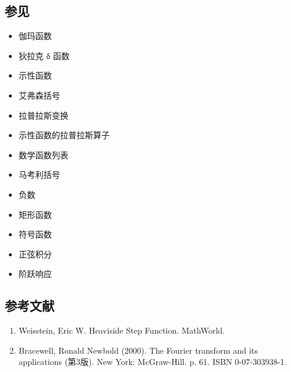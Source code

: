 \subsection{参见}
\begin{itemize}
\item 伽玛函数
\item 狄拉克 δ 函数
\item 示性函数
\item 艾弗森括号
\item 拉普拉斯变换
\item 示性函数的拉普拉斯算子
\item 数学函数列表
\item 马考利括号
\item 负数
\item 矩形函数
\item 符号函数
\item 正弦积分
\item 阶跃响应
\end{itemize}
\subsection{参考文献}
\begin{enumerate}
\item Weisstein, Eric W. Heaviside Step Function. MathWorld.
\item Bracewell, Ronald Newbold (2000). The Fourier transform and its applications (第3版). New York: McGraw-Hill. p. 61. ISBN 0-07-303938-1.
\end{enumerate}

